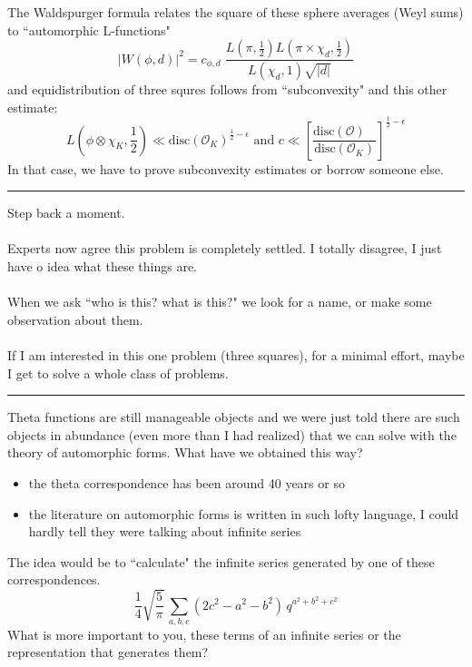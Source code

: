 \documentclass[12pt]{article}
\begin{document}
\newpage

\noindent The Waldspurger formula relates the square of these sphere averages (Weyl sums) to ``automorphic L-functions"
$$ \big|W(\phi, d)\big|^2 = c_{\phi, d} \; \frac{L(\pi, \frac{1}{2}) L(\pi \times \chi_d , \frac{1}{2})}{L(\chi_d, 1)\sqrt{|d|}} $$
and equidistribution of three squres follows from ``subconvexity" and this other estimate:
$$ L(\phi \otimes \chi_K, \frac{1}{2})  \ll \mathrm{disc}(\mathcal{O}_K)^{\frac{1}{2} - \epsilon} \text{ and } c \ll \left[\frac{\mathrm{disc}(\mathcal{O})\;\;\;}{\mathrm{disc}(\mathcal{O}_K)}\right]^{\frac{1}{2} - \epsilon} $$
In that case, we have to prove subconvexity estimates or borrow someone else.
\vspace{6pt}
\hrule
\vspace{6pt}
\noindent Step back a moment.  \\ \\
Experts now agree this problem is completely settled.  I totally disagree, I just have o idea what these things are.   \\ \\
When we ask ``who is this?  what is this?" we look for a name, or make some observation about them.  \\ \\
If I am interested in this one problem (three squares), for a minimal effort, maybe I get to solve a whole class of problems. 
\vspace{6pt}
\hrule
\vspace{6pt}
\noindent Theta functions are still manageable objects and we were just told there are such objects in abundance (even more than I had realized) that we can solve with the theory of automorphic forms.  What have we obtained this way?

\begin{itemize}
\item the theta correspondence has been around 40 years or so
\item the literature on automorphic forms is written in such lofty language, I could hardly tell they were talking about infinite series
\end{itemize}
The idea would be to ``calculate" the infinite series generated by one of these correspondences. 
$$ \frac{1}{4}\sqrt{\frac{5}{\pi}}\,\sum_{a,b,c} (2c^2 - a^2 - b^2)\,  q^{a^2 + b^2 + c^2} $$
 What is more important to you, these terms of an infinite series or the representation that generates them? 

\vfill
\end{document}
